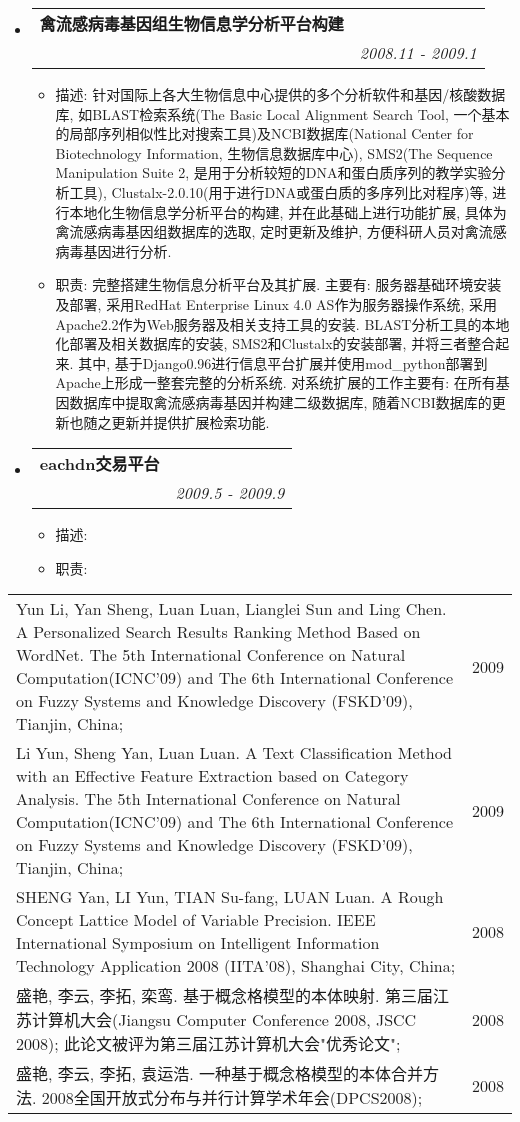 \documentclass[letterpaper,11pt]{article}
\makeatletter
\newcommand{\resitem}[1]{\item #1 \vspace{-2pt}}
\newcommand{\resheading}[1]{{\large \parashade[.9]{sharpcorners}{\textbf{#1 \vphantom{p\^{E}}}}}}
\newcommand{\ressubheading}[4]{
\begin{tabular*}{6.5in}{l@{\extracolsep{\fill}}r}
		\textbf{#1} & #2 \\
		\textit{#3} & \textit{#4} \\
\end{tabular*}\vspace{-6pt}}
\makeatother
\begin{document}
\begin{CJK}{UTF8}{hei}
\begin{itemize}
\item
	\ressubheading{禽流感病毒基因组生物信息学分析平台构建}{}{}{2008.11 - 2009.1}
	\begin{itemize}
		\resitem{	描述: 针对国际上各大生物信息中心提供的多个分析软件和基因/核酸数据库, 如BLAST检索系统(The Basic Local Alignment Search Tool, 一个基本的局部序列相似性比对搜索工具)及NCBI数据库(National Center for Biotechnology Information, 生物信息数据库中心), SMS2(The Sequence Manipulation Suite 2, 是用于分析较短的DNA和蛋白质序列的教学实验分析工具), Clustalx-2.0.10(用于进行DNA或蛋白质的多序列比对程序)等, 进行本地化生物信息学分析平台的构建, 并在此基础上进行功能扩展, 具体为禽流感病毒基因组数据库的选取, 定时更新及维护, 方便科研人员对禽流感病毒基因进行分析.}
		\resitem{	职责: 完整搭建生物信息分析平台及其扩展. 主要有: 服务器基础环境安装及部署, 采用RedHat Enterprise Linux 4.0 AS作为服务器操作系统, 采用Apache2.2作为Web服务器及相关支持工具的安装. BLAST分析工具的本地化部署及相关数据库的安装, SMS2和Clustalx的安装部署, 并将三者整合起来. 其中, 基于Django0.96进行信息平台扩展并使用mod\_python部署到Apache上形成一整套完整的分析系统. 对系统扩展的工作主要有: 在所有基因数据库中提取禽流感病毒基因并构建二级数据库, 随着NCBI数据库的更新也随之更新并提供扩展检索功能.}
	\end{itemize}

\item
	\ressubheading{eachdn交易平台}{}{}{2009.5 - 2009.9}
	\begin{itemize}
		\resitem{	描述: }
		\resitem{	职责: }
	\end{itemize}
	
\end{itemize}

\resheading{发表论文/书籍}
	\begin{tabular*}{6.5in}{l@{\extracolsep{\fill}}r}
		Yun Li, Yan Sheng, Luan Luan, Lianglei Sun and Ling Chen. A Personalized Search Results Ranking Method Based on WordNet. The 5th International Conference on Natural Computation(ICNC'09) and The 6th International Conference on Fuzzy Systems and Knowledge Discovery (FSKD'09), Tianjin, China;  & 2009\\
		Li Yun, Sheng Yan, Luan Luan. A Text Classification Method with an Effective Feature Extraction based on Category Analysis. The 5th International Conference on Natural Computation(ICNC'09) and The 6th International Conference on Fuzzy Systems and Knowledge Discovery (FSKD'09), Tianjin, China;  & 2009\\
		SHENG Yan, LI Yun, TIAN Su-fang, LUAN Luan. A Rough Concept Lattice Model of Variable Precision. IEEE International Symposium on Intelligent Information Technology Application 2008 (IITA'08), Shanghai City, China;   & 2008\\
		盛艳, 李云, 李拓, 栾鸾. 基于概念格模型的本体映射. 第三届江苏计算机大会(Jiangsu Computer Conference 2008, JSCC 2008); 此论文被评为第三届江苏计算机大会"优秀论文";  & 2008\\
		盛艳, 李云, 李拓, 袁运浩. 一种基于概念格模型的本体合并方法. 2008全国开放式分布与并行计算学术年会(DPCS2008);  & 2008\\
\end{tabular*}


\end{CJK}
\end{document}

